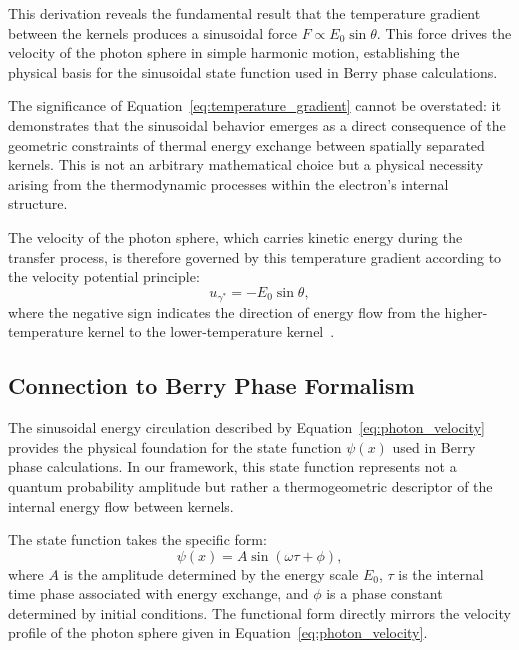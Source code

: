 \documentclass[%
 reprint,
 amsmath,amssymb,
 aps,
]{revtex4-1}
\numberwithin{equation}{section}%
\begin{document}
This derivation reveals the fundamental result that the temperature gradient between the kernels produces a sinusoidal force $F \propto E_0 \sin\theta$. This force drives the velocity of the photon sphere in simple harmonic motion, establishing the physical basis for the sinusoidal state function used in Berry phase calculations.

The significance of Equation~\eqref{eq:temperature_gradient} cannot be overstated: it demonstrates that the sinusoidal behavior emerges as a direct consequence of the geometric constraints of thermal energy exchange between spatially separated kernels. This is not an arbitrary mathematical choice but a physical necessity arising from the thermodynamic processes within the electron's internal structure.

The velocity of the photon sphere, which carries kinetic energy during the transfer process, is therefore governed by this temperature gradient according to the velocity potential principle:
\begin{equation}
\boxed{u_{\gamma^*} = -E_0 \sin\theta}, \label{eq:photon_velocity}
\end{equation}
where the negative sign indicates the direction of energy flow from the higher-temperature kernel to the lower-temperature kernel~\cite{hanamura1811.0312}.

\subsection{Connection to Berry Phase Formalism} \label{subsec:berry_connection}

The sinusoidal energy circulation described by Equation~\eqref{eq:photon_velocity} provides the physical foundation for the state function $\psi(x)$ used in Berry phase calculations. In our framework, this state function represents not a quantum probability amplitude but rather a thermogeometric descriptor of the internal energy flow between kernels.

The state function takes the specific form:
\begin{equation}
\psi(x) = A \sin(\omega \tau + \phi), \label{eq:state_function}
\end{equation}
where $A$ is the amplitude determined by the energy scale $E_0$, $\tau$ is the internal time phase associated with energy exchange, and $\phi$ is a phase constant determined by initial conditions. The functional form directly mirrors the velocity profile of the photon sphere given in Equation~\eqref{eq:photon_velocity}.
\end{document}
